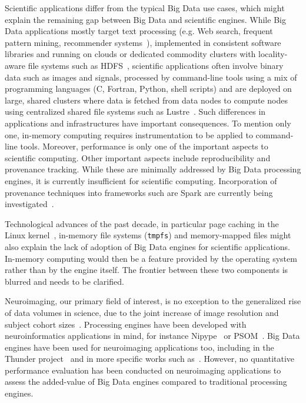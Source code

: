 \documentclass{IEEEtran}
\newcommand{\todo}[1]{\marginpar{\parbox{18mm}{\flushleft\tiny\color{red}\textbf{TODO}:
      #1}}}
\begin{document}
Scientific applications differ from the typical Big Data use 
cases, which might explain the remaining gap between Big Data and 
scientific engines. While Big Data applications mostly target text 
processing (e.g. Web search, frequent pattern mining, recommender 
systems~\cite{leskovec2014mining}), implemented in consistent software 
libraries and running on clouds or dedicated commodity clusters with locality-aware 
file systems such as HDFS~\cite{shvachko2010hadoop}, scientific applications 
often involve binary data such as images and signals, processed by 
command-line tools using a mix of programming languages (C, Fortran, 
Python, shell scripts) and are deployed on large, shared clusters where 
data is fetched from data nodes to compute nodes using centralized shared file 
systems such as Lustre~\cite{schwan2003lustre}. Such differences in 
applications and infrastructures have important consequences. To 
mention only one, in-memory computing requires instrumentation to be 
applied to command-line tools. Moreover, performance is only one of the important
aspects to scientific computing. Other important aspects include reproducibility 
and provenance tracking. While these are minimally addressed by Big Data
processing engines, it is currently insufficient for scientific computing. 
Incorporation of provenance techniques into frameworks such are Spark are
currently being investigated~\cite{samba}.

Technological advances of the past decade, in particular page caching 
in the Linux kernel~\cite{love2010linux}, in-memory file systems 
(\texttt{tmpfs}) and memory-mapped files\todo{check that} might also 
explain the lack of adoption of Big Data engines for scientific 
applications.
In-memory computing would then be a feature provided by 
the operating system rather than by the engine itself. The frontier 
between these two components is blurred and needs to be clarified.



Neuroimaging, our primary field of interest, is no exception to the 
generalized rise of data volumes in science, due to the joint increase 
of image resolution and subject cohort sizes~\cite{van2014human}. 
Processing engines have been developed with neuroinformatics 
applications in mind, for instance Nipype~\cite{gorgolewski2011nipype} 
or PSOM~\cite{bellec2012pipeline}. Big Data engines have been used for 
neuroimaging applications too, including in the Thunder 
project~\cite{freeman2014mapping} and in more specific works such 
as~\cite{makkie2019fast}. However, no quantitative performance 
evaluation has been conducted on neuroimaging applications to assess the 
added-value of Big Data engines compared to traditional processing engines.
\end{document}
